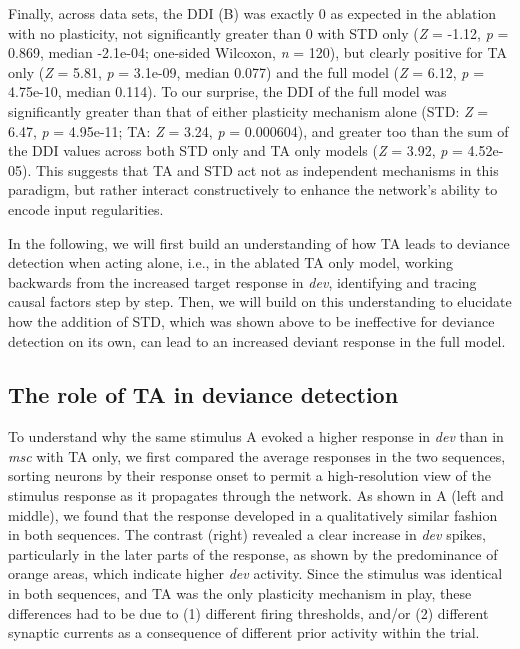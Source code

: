 \documentclass[9pt,lineno,onehalfspacing]{elife}
\newcommand{\dev}{\textit{dev}}
\newcommand{\msc}{\textit{msc}}
\begin{document}
Finally, across data sets, the DDI (B) was exactly 0 as expected in the ablation with no plasticity, not significantly greater than 0 with STD only (\textit{Z} = -1.12, \textit{p} = 0.869, median -2.1e-04; one-sided Wilcoxon, \textit{n} = 120), but clearly positive for TA only (\textit{Z} = 5.81, \textit{p} = 3.1e-09, median 0.077) and the full model (\textit{Z} = 6.12, \textit{p} = 4.75e-10, median 0.114). To our surprise, the DDI of the full model was significantly greater than that of either plasticity mechanism alone (STD: \textit{Z} = 6.47, \textit{p} = 4.95e-11; TA: \textit{Z} = 3.24, \textit{p} = 0.000604), and greater too than the sum of the DDI values across both STD only and TA only models (\textit{Z} = 3.92, \textit{p} = 4.52e-05). This suggests that TA and STD act not as independent mechanisms in this paradigm, but rather interact constructively to enhance the network's ability to encode input regularities.

In the following, we will first build an understanding of how TA leads to deviance detection when acting alone, i.e., in the ablated TA only model, working backwards from the increased target response in \dev{}, identifying and tracing causal factors step by step. Then, we will build on this understanding to elucidate how the addition of STD, which was shown above to be ineffective for deviance detection on its own, can lead to an increased deviant response in the full model.

\subsection{The role of TA in deviance detection}\label{sec:ta}

To understand why the same stimulus A evoked a higher response in \dev{} than in \msc{} with TA only, we first compared the average responses in the two sequences, sorting neurons by their response onset to permit a high-resolution view of the stimulus response as it propagates through the network. As shown in A (left and middle), we found that the response developed in a qualitatively similar fashion in both sequences. The contrast (right) revealed a clear increase in \dev{} spikes, particularly in the later parts of the response, as shown by the predominance of orange areas, which indicate higher \dev{} activity. Since the stimulus was identical in both sequences, and TA was the only plasticity mechanism in play, these differences had to be due to (1) different firing thresholds, and/or (2) different synaptic currents as a consequence of different prior activity within the trial.
\end{document}
